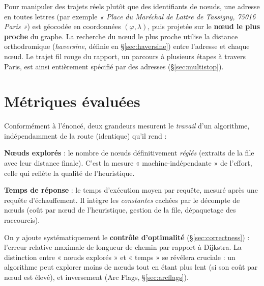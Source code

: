 Pour manipuler des trajets réels plutôt que des identifiants de nœuds, une
adresse en toutes lettres (par exemple \emph{« Place du Maréchal de Lattre de
Tassigny, 75016 Paris »}) est géocodée en coordonnées $(\varphi, \lambda)$, puis
projetée sur le \textbf{nœud le plus proche} du graphe. La recherche du nœud le
plus proche utilise la distance orthodromique (\emph{haversine}, définie en
\S\ref{sec:haversine}) entre l'adresse et chaque nœud. Le trajet fil rouge du
rapport, un parcours à plusieurs étapes à travers Paris, est ainsi entièrement
spécifié par des adresses (\S\ref{sec:multistop}).

\section{Métriques évaluées}
\label{sec:metriques}

Conformément à l'énoncé, deux grandeurs mesurent le \emph{travail} d'un
algorithme, indépendamment de la route (identique) qu'il rend :

\begin{bulletlist}
  \item \textbf{Nœuds explorés} : le nombre de nœuds définitivement
        \emph{réglés} (extraits de la file avec leur distance finale). C'est la
        mesure « machine-indépendante » de l'effort, celle qui reflète la qualité
        de l'heuristique.
  \item \textbf{Temps de réponse} : le temps d'exécution moyen par requête,
        mesuré après une requête d'échauffement. Il intègre les \emph{constantes}
        cachées par le décompte de nœuds (coût par nœud de l'heuristique, gestion
        de la file, dépaquetage des raccourcis).
\end{bulletlist}

\noindent
On y ajoute systématiquement le \textbf{contrôle d'optimalité}
(\S\ref{sec:correctness}) : l'erreur relative maximale de longueur de chemin par rapport
à Dijkstra. La distinction entre « nœuds explorés » et « temps » se révélera
cruciale : un algorithme peut explorer moins de nœuds tout en étant plus lent (si
son coût par nœud est élevé), et inversement (Arc Flags, \S\ref{sec:arcflags}).
